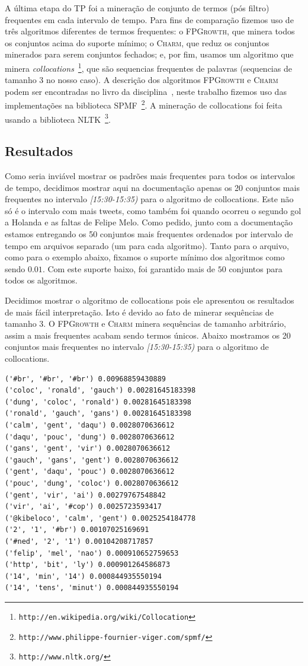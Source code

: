 \documentclass[brazil,a4paper,12pt]{article}
\begin{document}
A última etapa do TP foi a mineração de conjunto de termos (pós filtro)
frequentes em cada intervalo de tempo. Para fins de comparação fizemos
uso de três algoritmos diferentes de termos frequentes: o 
\textsc{FPGrowth}, que minera todos os conjuntos acima do suporte mínimo;
o \textsc{Charm}, que reduz os conjuntos minerados para serem conjuntos
fechados; e, por fim, usamos um algoritmo que minera 
{\it collocations}~\footnote{\texttt{http://en.wikipedia.org/wiki/Collocation}}, 
que são sequencias frequentes de palavras (sequencias de tamanho 3 no
nosso caso). A descrição dos algoritmos \textsc{FPGrowth} e \textsc{Charm}
podem ser encontradas no livro da disciplina~\cite{meira}, neste trabalho
fizemos uso das implementações na biblioteca 
SPMF~\footnote{\texttt{http://www.philippe-fournier-viger.com/spmf/}}. A
mineração de collocations foi feita usando a biblioteca 
NLTK~\footnote{\texttt{http://www.nltk.org/}}.

\subsection{Resultados}

Como seria inviável mostrar os padrões mais frequentes para todos os intervalos
de tempo, decidimos mostrar aqui na documentação apenas os 20 conjuntos mais
frequentes no intervalo \emph{[15:30-15:35)} para o algoritmo de collocations. 
Este não só é o intervalo com mais tweets, como também foi quando ocorreu o 
segundo gol a Holanda e as faltas de Felipe Melo. Como pedido, junto com a 
documentação estamos entregando os 50 conjuntos mais frequentes ordenados por 
intervalo de tempo em arquivos separado (um para cada algoritmo). 
Tanto para o arquivo, como para o exemplo abaixo, fixamos o suporte
mínimo dos algoritmos como sendo $0.01$. Com este suporte baixo, foi garantido
mais de $50$ conjuntos para todos os algoritmos. 

Decidimos mostrar o algoritmo de collocations pois ele apresentou os resultados 
de mais fácil interpretação. Isto é devido ao fato de minerar sequências de tamanho
3. O \textsc{FPGrowth} e \textsc{Charm} minera sequências de tamanho arbitrário,
assim a mais frequentes acabam sendo termos únicos. Abaixo mostramos
os 20 conjuntos mais frequentes no intervalo \emph{[15:30-15:35)} para o algoritmo de collocations.

\begin{verbatim}
('#br', '#br', '#br') 0.00968859430889
('coloc', 'ronald', 'gauch') 0.00281645183398
('dung', 'coloc', 'ronald') 0.00281645183398
('ronald', 'gauch', 'gans') 0.00281645183398
('calm', 'gent', 'daqu') 0.0028070636612
('daqu', 'pouc', 'dung') 0.0028070636612
('gans', 'gent', 'vir') 0.0028070636612
('gauch', 'gans', 'gent') 0.0028070636612
('gent', 'daqu', 'pouc') 0.0028070636612
('pouc', 'dung', 'coloc') 0.0028070636612
('gent', 'vir', 'ai') 0.00279767548842
('vir', 'ai', '#cop') 0.0025723593417
('@kibeloco', 'calm', 'gent') 0.0025254184778
('2', '1', '#br') 0.00107025169691
('#ned', '2', '1') 0.00104208717857
('felip', 'mel', 'nao') 0.000910652759653
('http', 'bit', 'ly') 0.000901264586873
('14', 'min', '14') 0.000844935550194
('14', 'tens', 'minut') 0.000844935550194
\end{verbatim}
\end{document}
